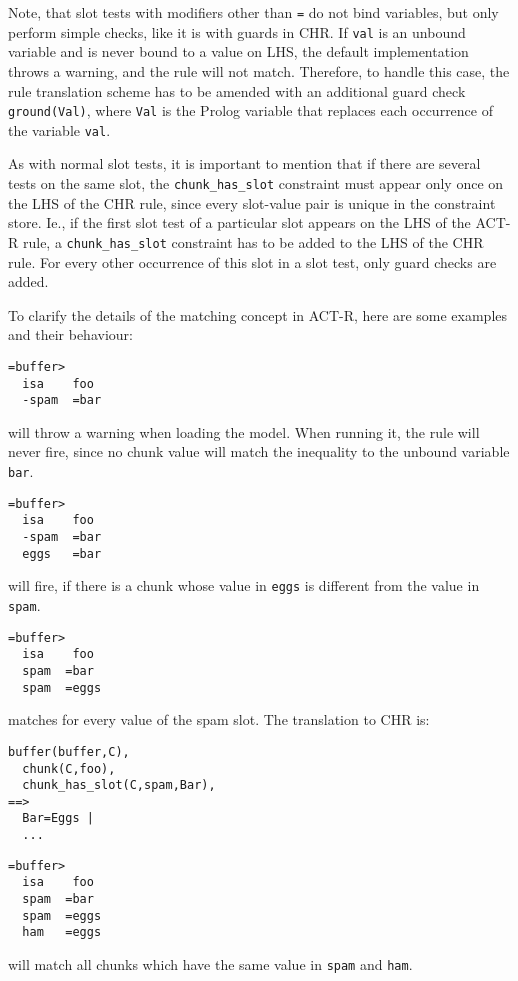 Note, that slot tests with modifiers other than \verb|=| do not bind variables, but only perform simple checks, like it is with guards in CHR. If \verb|val| is an unbound variable and is never bound to a value on LHS, the default implementation throws a warning, and the rule will not match. Therefore, to handle this case, the rule translation scheme has to be amended with an additional guard check \verb|ground(Val)|, where \verb|Val| is the Prolog variable that replaces each occurrence of the variable \verb|val|.

As with normal slot tests, it is important to mention that if there are several tests on the same slot, the \verb|chunk_has_slot| constraint must appear only once on the LHS of the CHR rule, since every slot-value pair is unique in the constraint store. Ie., if the first slot test of a particular slot appears on the LHS of the ACT-R rule, a \verb|chunk_has_slot| constraint has to be added to the LHS of the CHR rule. For every other occurrence of this slot in a slot test, only guard checks are added.

\begin{example}
To clarify the details of the matching concept in ACT-R, here are some examples and their behaviour:

\begin{lstlisting}
=buffer>
  isa    foo
  -spam  =bar
\end{lstlisting}

will throw a warning when loading the model. When running it, the rule will never fire, since no chunk value will match the inequality to the unbound variable \verb|bar|.

\begin{lstlisting}
=buffer>
  isa    foo
  -spam  =bar
  eggs   =bar
\end{lstlisting}

will fire, if there is a chunk whose value in \verb|eggs| is different from the value in \verb|spam|.

\begin{lstlisting}
=buffer>
  isa    foo
  spam  =bar
  spam  =eggs
\end{lstlisting}

matches for every value of the spam slot. The translation to CHR is:

\begin{lstlisting}
buffer(buffer,C),
  chunk(C,foo),
  chunk_has_slot(C,spam,Bar),
==>
  Bar=Eggs |
  ...
\end{lstlisting}

\begin{lstlisting}
=buffer>
  isa    foo
  spam  =bar
  spam  =eggs
  ham   =eggs
\end{lstlisting}

will match all chunks which have the same value in \verb|spam| and \verb|ham|. 

\end{example}


